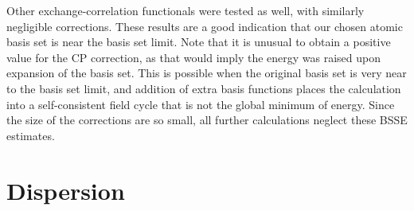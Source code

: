 \documentclass[titlepage,11pt]{article}
\begin{document}
Other exchange-correlation functionals were tested as well, with similarly negligible corrections. These results are a good indication that our chosen atomic basis set is near the basis set limit. Note that it is unusual to obtain a positive value for the CP correction, as that would imply the energy was raised upon expansion of the basis set. This is possible when the original basis set is very near to the basis set limit, and addition of extra basis functions places the calculation into a self-consistent field cycle that is not the global minimum of energy. Since the size of the corrections are so small, all further calculations neglect these BSSE estimates.

\section{Dispersion}
\end{document}
